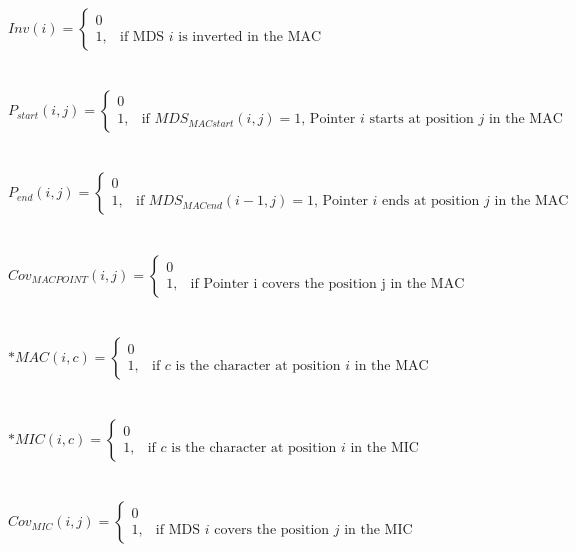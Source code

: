 $Inv(i) = \begin{cases} 0 \\ 1, & \mbox{if MDS } i\mbox{ is inverted in the MAC } \end{cases}$ \\\\\\
$P_{start}(i,j) = \begin{cases} 0 \\ 1, & \mbox{if } MDS_{MACstart}(i,j) = 1 \mbox{, Pointer } i \mbox{ starts at position } j \mbox{ in the MAC} \end{cases}$ \\\\\\
$P_{end}(i,j) = \begin{cases} 0 \\ 1, & \mbox{if } MDS_{MACend}(i-1,j) = 1 \mbox{, Pointer } i \mbox{ ends at position } j \mbox{ in the MAC} \end{cases}$ \\\\\\
$Cov_{MACPOINT}(i,j) = \begin{cases} 0 \\ 1, & \mbox{if Pointer i covers the position j in the MAC} \end{cases}$ \\\\\\
$*MAC(i,c) = \begin{cases} 0 \\ 1, & \mbox{if } c\mbox{ is the character at position } i \mbox{ in the MAC} \end{cases}$ \\\\\\
$*MIC(i,c) = \begin{cases} 0 \\ 1, & \mbox{if } c\mbox{ is the character at position } i \mbox{ in the MIC} \end{cases}$ \\\\\\
$Cov_{MIC}(i,j) = \begin{cases} 0 \\ 1, & \mbox{if MDS } i\mbox{ covers the position } j \mbox{ in the MIC} \end{cases}$ \\\\\\
